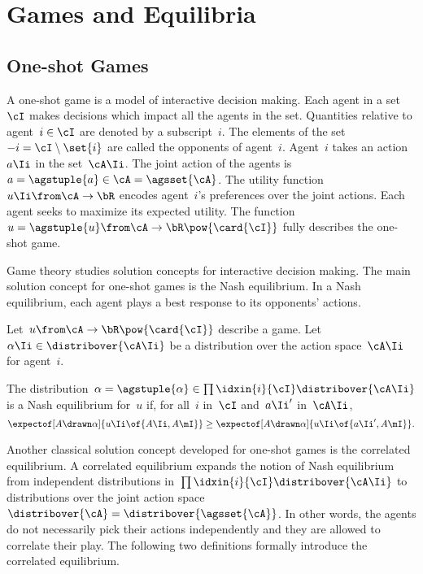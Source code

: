 \section{Games and Equilibria}
\label{sec:games_and_equilibria}

\subsection{One-shot Games}
A one-shot game is a model of interactive decision making.
Each agent in a set~\(\cI\) makes decisions which impact all the agents in the set.
Quantities relative to agent~\(i \in \cI\) are denoted by a subscript~\(i\).
The elements of the set~\(-i = \cI \setminus \set{i}\) are called the opponents of agent~\(i\).
Agent~\(i\) takes an action~\(a\Ii\) in the set~\(\cA\Ii\).
The joint action of the agents is~\(a = \agstuple{a} \in \cA = \agsset{\cA}\).
The utility function~\(u\Ii \from \cA \to \bR\) encodes agent~\(i\)'s preferences over the joint actions.
Each agent seeks to maximize its expected utility.
The function~\(u = \agstuple{u} \from \cA \to \bR\pow{\card{\cI}}\) fully describes the one-shot game.

Game theory studies solution concepts for interactive decision making.
The main solution concept for one-shot games is the Nash equilibrium.
In a Nash equilibrium, each agent plays a best response to its opponents' actions.

\begin{definition}
Let~\(u \from \cA \to \bR \pow{\card{\cI}}\) describe a game.
Let~\(\alpha\Ii \in \distribover{\cA\Ii}\) be a distribution over the action space~\(\cA\Ii\) for agent~\(i\).

The distribution~\(\alpha = \agstuple{\alpha} \in \prod\idxin{i}{\cI} \distribover{\cA\Ii}\) is a Nash equilibrium for~\(u\) if, for all~\(i\) in~\(\cI\) and~\(a\Ii'\) in~\(\cA\Ii\),
\[
\expectof[A \drawn \alpha]{u\Ii \of{A\Ii, A\mI}}
\ge
\expectof[A \drawn \alpha]{u\Ii \of{a\Ii', A\mI}}
.
\]
\end{definition}

Another classical solution concept developed for one-shot games is the correlated equilibrium.
A correlated equilibrium expands the notion of Nash equilibrium from independent distributions in~\(\prod\idxin{i}{\cI} \distribover{\cA\Ii}\) to distributions over the joint action space~\(\distribover{\cA} = \distribover{\agsset{\cA}}\).
In other words, the agents do not necessarily pick their actions independently and they are allowed to correlate their play.
The following two definitions formally introduce the correlated equilibrium.

